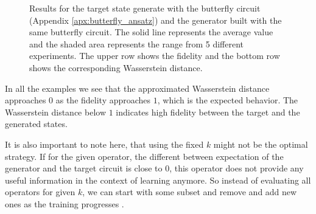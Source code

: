 \begin{figure}[htbp!]
  \caption{Results for the target state generate with the butterfly circuit
    (Appendix \ref{apx:butterfly_ansatz}) and the generator built with the same 
    butterfly circuit.
    The solid line represents the average value and the shaded area
    represents the range from 5 different experiments. The upper row shows the
    fidelity and the bottom row shows the corresponding Wasserstein distance.}
  \label{fig:wqgans_res_butterfly_same}
\end{figure}


In all the examples we see that the approximated Wasserstein distance approaches $0$
as the fidelity approaches $1$, which is the expected behavior. The Wasserstein
distance below $1$ indicates high fidelity between the target and the generated
states.

It is also important to note here, that using the fixed $k$ might not be the optimal
strategy. If for the given operator, the different between expectation of the
generator and the target circuit is close to $0$, this operator does not
provide any useful information in the context of learning anymore. So instead of
evaluating all operators for given $k$, we can start with some subset and
remove and add new ones as the training progresses \cite{kiani2021quantum}. 
